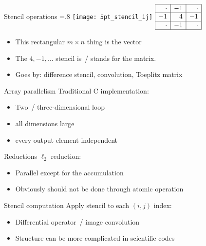\documentclass[10pt,t]{beamer}
\begin{document}
\begin{frame}[containsverbatim]{Stencil operations}
  \hbox{}
  \vbox {\leavevmode \hsize=.8\textwidth
    \hbox{\texttt{[image: 5pt\_stencil\_ij]}}
    \hfill 
    \(
    \begin{array}{|r|r|r|}
      \hline
      \cdot&-1&\cdot\\
      \hline
      -1&4&-1\\
      \hline
      \cdot&-1&\cdot\\
      \hline
    \end{array}
    \)
    \hfill 
    }
  \begin{itemize}
  \item This rectangular $m\times n$ thing is the vector
  \item The $4,-1,\ldots$ stencil is~/ stands for the matrix.
  \item Goes by: difference stencil, convolution, Toeplitz matrix
  \end{itemize}
\end{frame}

\begin{frame}[containsverbatim]{Array parallelism}
  Traditional C implementation:
  
  \begin{itemize}
  \item Two~/ three-dimensional loop
  \item all dimensions large
  \item every output element independent
  \end{itemize}
\end{frame}

\begin{frame}[containsverbatim]{Reductions}
  $\ell_2$ reduction:%
  \begin{itemize}
  \item Parallel except for the accumulation
  \item Obviously should not be done through atomic operation
  \end{itemize}
\end{frame}

\begin{frame}[containsverbatim]{Stencil computation}
  Apply stencil to each $(i,j)$ index:
  \begin{itemize}
  \item Differential operator~/ image convolution
  \item Structure can be more complicated in scientific codes
  \end{itemize}
\end{frame}
\end{document}
